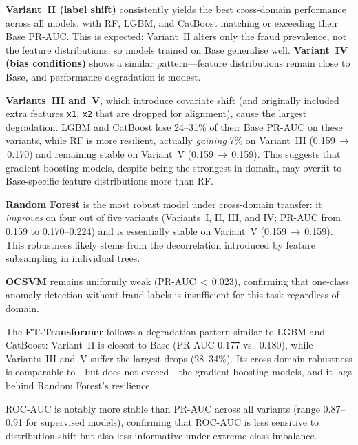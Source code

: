 \textbf{Variant~II (label shift)} consistently yields the best cross-domain performance across all models, with RF, LGBM, and CatBoost matching or exceeding their Base PR-AUC.
This is expected: Variant~II alters only the fraud prevalence, not the feature distributions, so models trained on Base generalise well.
\textbf{Variant~IV (bias conditions)} shows a similar pattern---feature distributions remain close to Base, and performance degradation is modest.

\textbf{Variants~III and~V}, which introduce covariate shift (and originally included extra features \texttt{x1}, \texttt{x2} that are dropped for alignment), cause the largest degradation.
LGBM and CatBoost lose 24--31\% of their Base PR-AUC on these variants, while RF is more resilient, actually \emph{gaining} 7\% on Variant~III (0.159\,$\to$\,0.170) and remaining stable on Variant~V (0.159\,$\to$\,0.159).
This suggests that gradient boosting models, despite being the strongest in-domain, may overfit to Base-specific feature distributions more than RF.

\textbf{Random Forest} is the most robust model under cross-domain transfer: it \emph{improves} on four out of five variants (Variants~I, II, III, and IV; PR-AUC from 0.159 to 0.170--0.224) and is essentially stable on Variant~V (0.159\,$\to$\,0.159).
This robustness likely stems from the decorrelation introduced by feature subsampling in individual trees.

\textbf{OCSVM} remains uniformly weak (PR-AUC\,$<$\,0.023), confirming that one-class anomaly detection without fraud labels is insufficient for this task regardless of domain.

The \textbf{FT-Transformer} follows a degradation pattern similar to LGBM and CatBoost: Variant~II is closest to Base (PR-AUC 0.177 vs.\ 0.180), while Variants~III and~V suffer the largest drops (28--34\%).
Its cross-domain robustness is comparable to---but does not exceed---the gradient boosting models, and it lags behind Random Forest's resilience.

ROC-AUC is notably more stable than PR-AUC across all variants (range 0.87--0.91 for supervised models), confirming that ROC-AUC is less sensitive to distribution shift but also less informative under extreme class imbalance.



